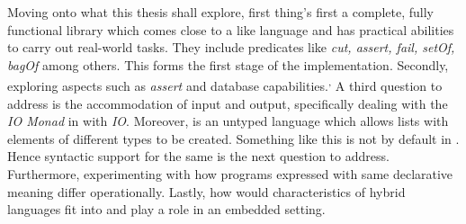 \documentclass[thesis-solanki.tex]{subfiles}
\begin{document}
Moving onto what this thesis shall explore, first thing's first a complete, fully functional library which comes
close to a  like language and has practical abilities to carry out real-world tasks.
They include predicates like \textit{cut, assert, fail, setOf, bagOf} among others.
This form{\Huge s}
the first stage of the implementation.
Secondly, exploring aspects such as \textit{assert} and database capabilities.\textsuperscript{,}
A third question to address is the accommodation of input and output, specifically dealing with the \textit{IO
  Monad} in  with  \textit{IO}.
Moreover,  is an untyped language which allows lists with elements of different types to be
created.
Something like this is not by default in .
Hence syntactic support for the same is the next question to address.
Furthermore, experimenting with how programs expressed with same declarative meaning differ operationally.
Lastly, how would characteristics of hybrid languages fit into and play a role in an embedded setting.
\end{document}
